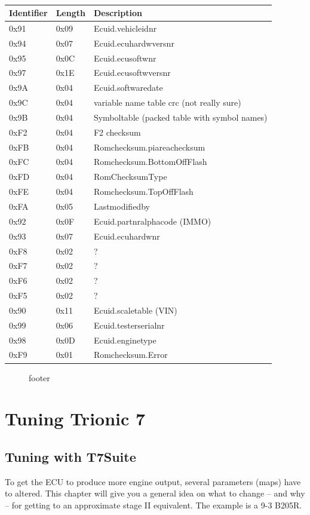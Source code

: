 \documentclass[11pt,a4paper]{book}
\newcommand{\Mfig}[1]{%
\begin{figure}
    \centering
    \missingfigure{#1}
    \caption{#1}
\end{figure}}
\begin{document}
\begin{table}
    \centering
    \begin{tabular}{lll}
        Identifier & Length & Description \\
        \midrule
        0x91& 0x09& Ecuid.vehicleidnr \\
        0x94 & 0x07 & Ecuid.ecuhardwversnr \\
        0x95 & 0x0C & Ecuid.ecusoftwnr \\
        0x97 & 0x1E & Ecuid.ecusoftwversnr \\
        0x9A & 0x04 & Ecuid.softwaredate \\
        0x9C & 0x04 & variable name table crc (not really sure) \\
        0x9B & 0x04 & Symboltable (packed table with symbol names) \\
        0xF2 & 0x04 & F2 checksum \\
        0xFB & 0x04 & Romchecksum.piareachecksum \\
        0xFC & 0x04 & Romchecksum.BottomOffFlash \\
        0xFD & 0x04 & RomChecksumType \\
        0xFE & 0x04 & Romchecksum.TopOffFlash \\
        0xFA & 0x05 & Lastmodifiedby \\
        0x92 & 0x0F & Ecuid.partnralphacode (IMMO) \\
        0x93 & 0x07 & Ecuid.ecuhardwnr \\
        0xF8 & 0x02 & ? \\
        0xF7 & 0x02 & ? \\
        0xF6 & 0x02 & ? \\
        0xF5 & 0x02 & ? \\
        0x90 & 0x11 & Ecuid.scaletable (VIN) \\
        0x99 & 0x06 & Ecuid.testerserialnr \\
        0x98 & 0x0D & Ecuid.enginetype \\
        0xF9 & 0x01 & Romchecksum.Error
    \end{tabular}
    \caption{}
    \label{tab:}
\end{table}
\Mfig{footer}

\chapter{Tuning Trionic 7}
\section{Tuning with T7Suite}
To get the ECU to produce more engine output, several parameters (maps) have to
altered. This chapter will give you a general idea on what to change – and why –
for getting to an approximate stage II equivalent. The example is a 9-3 B205R.
\end{document}
